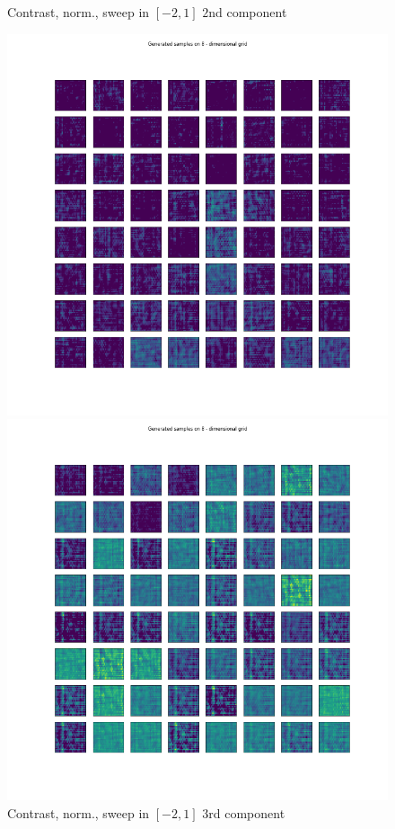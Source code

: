 \documentclass[12pt, english]{article}
\begin{document}
\begin{figure}[H]
\begin{minipage}[b]{0.5\linewidth}
    \caption{Contrast, norm., sweep in $[-2, 1]$ \newline $2$nd component} 
    \label{fig:contrast-norm-sweep-2}
  \end{minipage}
\end{figure}


\begin{figure}[H]
  \begin{minipage}[b]{0.5\linewidth}
    \centering
    \includegraphics[width=.85\linewidth]{sweep/norm_contrast_sweep_minus_two_to_one_3rd_param.png} 
    \caption{Contrast, norm., sweep in $[-2, 1]$ \newline  $3$rd component} 
    \label{fig:contrast-norm-sweep-3}
  \end{minipage}
  \begin{minipage}[b]{0.5\linewidth}
    \centering
    \includegraphics[width=.85\linewidth]{sweep/norm_contrast_sweep_zero_to_two_6th_param.png} 

\end{minipage}
\end{figure}
\end{document}
